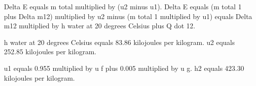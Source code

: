 Delta E equals m total multiplied by (u2 minus u1).  
Delta E equals (m total 1 plus Delta m12) multiplied by u2 minus (m total 1 multiplied by u1) equals Delta m12 multiplied by h water at 20 degrees Celsius plus Q dot 12.  

h water at 20 degrees Celsius equals 83.86 kilojoules per kilogram.  
u2 equals 252.85 kilojoules per kilogram.  

u1 equals 0.955 multiplied by u f plus 0.005 multiplied by u g.  
h2 equals 423.30 kilojoules per kilogram.